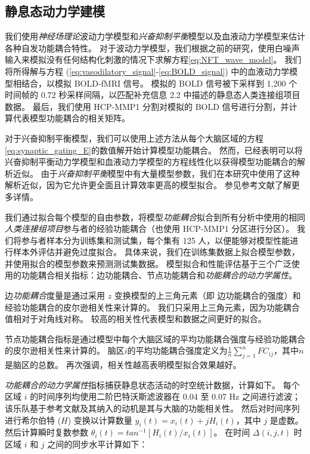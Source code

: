 \documentclass[lang=cn,a4paper,newtx]{elegantpaper}
\begin{document}
\subsection{静息态动力学建模} \label{sec:modelling_resting}

我们使用\textit{神经场理论}波动力学模型和\textit{兴奋抑制平衡}模型以及血液动力学模型来估计各种自发功能耦合特性。
对于波动力学模型，我们根据之前的研究\cite{robinson2005multiscale,sanz2018nftsim}，使用白噪声输入来模拟没有任何结构化刺激的情况下求解方程\ref{eq:NFT_wave_model}。
我们将所得解与方程 (\ref{eq:vasodilatory_signal}-\ref{eq:BOLD_signal}) 中的血液动力学模型相结合，以模拟 BOLD-fMRI 信号。
模拟的 BOLD 信号被下采样到 1,200 个时间帧的 0.72 秒采样间隔，以匹配补充信息 2.2 中描述的静息态人类连接组项目数据。
最后，我们使用 HCP-MMP1 分割对模拟的 BOLD 信号进行分割，并计算代表模型功能耦合的相关矩阵。


对于兴奋抑制平衡模型，我们可以使用上述方法从每个大脑区域的方程\ref{eq:synaptic_gating_E}的数值解开始计算模型功能耦合。
然而，已经表明可以将兴奋抑制平衡动力学模型和血液动力学模型的方程线性化以获得模型功能耦合\cite{demirtacs2019hierarchical}的解析近似。
由于\textit{兴奋抑制平衡}模型中有大量模型参数，我们在本研究中使用了这种解析近似，因为它允许更全面且计算效率更高的模型拟合。
参见参考文献\cite{demirtacs2019hierarchical}了解更多详情。


我们通过拟合每个模型的自由参数，将模型\textit{功能耦合}拟合到所有分析中使用的相同\textit{人类连接组项目}参与者的经验功能耦合（也使用 HCP-MMP1 分区进行分区）。
我们将参与者样本分为训练集和测试集，每个集有 125 人，以便能够对模型性能进行样本外评估并避免过度拟合。
具体来说，我们在训练集数据上拟合模型参数，并使用拟合的模型参数来预测测试集数据。
模型拟合和性能评估基于三个广泛使用的功能耦合相关指标\cite{deco2021dynamical,aquino2022intersection}：边功能耦合、节点功能耦合和\textit{功能耦合的动力学属性}。


边\textit{功能耦合}度量是通过采用 $ z $ 变换模型的上三角元素（即 边功能耦合的强度）和经验功能耦合的皮尔逊相关性来计算的。
我们只采用上三角元素，因为功能耦合值相对于对角线对称。
较高的相关性代表模型和数据之间更好的拟合。


节点功能耦合指标是通过模型中每个大脑区域的平均功能耦合强度与经验功能耦合的皮尔逊相关性来计算的。
脑区$ i $的平均功能耦合强度定义为$ \frac{1}{n} \sum_{j=1}^{n} FC_{ij} $，其中$ n $是脑区的总数。
再次强调，相关性越高表明模型拟合效果越好。


\textit{功能耦合的动力学属性}指标捕获静息状态活动的时空统计数据，计算如下\cite{aquino2022intersection}。
每个区域 $ i $ 的时间序列均使用二阶巴特沃斯滤波器在 0.04 至 0.07 Hz 之间进行滤波；
该乐队基于参考文献\cite{deco2017dynamics}及其纳入的动机是其与大脑的功能相关性\cite{glerean2012functional,pang2019power}。
然后对时间序列进行希尔伯特 ($ H $) 变换以计算数量 $ y_i(t) = x_i(t) + jH_i (t) $，其中 $ j $ 是虚数。
然后计算瞬时复数参数 $ \theta_i(t) = tan^{-1} [H_i(t) / x_i(t)] $。
在时间 $ \Delta(i,j,t) $ 时区域 $ i $ 和 $ j $ 之间的同步水平计算如下：
\end{document}
